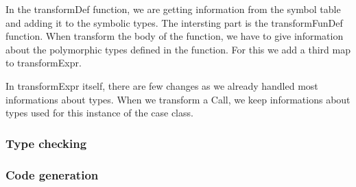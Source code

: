In the transformDef function, we are getting information from the symbol table and adding it to the symbolic types. The intersting part is the transformFunDef function. When transform the body of the function, we have to give information about the polymorphic types defined in the function. For this we add a third map to transformExpr.

In transformExpr itself, there are few changes as we already handled most informations about types. When we transform a Call, we keep informations about types used for this instance of the case class.
\subsubsection{Type checking}
\subsubsection{Code generation}
